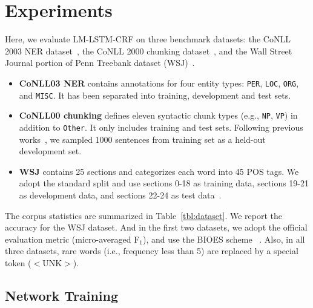 \documentclass[letterpaper]{article} \usepackage{aaai18}  \usepackage{times}  \usepackage{helvet}  \usepackage{courier}  \usepackage{url}  \usepackage{graphicx}  \usepackage{multirow}
\newcommand{\our}{\textsc{LM-LSTM-CRF}\xspace}
\begin{document}
\section{Experiments}
\label{sect:exp}

Here, we evaluate \our on three benchmark datasets: the CoNLL 2003 NER dataset~\cite{tjong2003introduction}, the CoNLL 2000 chunking dataset~\cite{tjong2000introduction}, and the Wall Street Journal portion of Penn Treebank dataset (WSJ)~\cite{marcus1993building}.
\begin{itemize}[noitemsep,nolistsep]
\item \textbf{CoNLL03 NER} contains annotations for four entity types: \texttt{PER}, \texttt{LOC}, \texttt{ORG}, and \texttt{MISC}. It has been separated into training, development and test sets.
\item \textbf{CoNLL00 chunking} defines eleven syntactic chunk types (e.g., \texttt{NP}, \texttt{VP}) in addition to \texttt{Other}. It only includes training and test sets. Following previous works~\cite{peters2017semi}, we sampled 1000 sentences from training set as a held-out development set.
\item \textbf{WSJ} contains 25 sections and categorizes each word into 45 POS tags. We adopt the standard split and use sections 0-18 as training data, sections 19-21 as development data, and sections 22-24 as test data~\cite{manning2011part}.
\end{itemize}

The corpus statistics are summarized in Table~\ref{tbl:dataset}. 
We report the accuracy for the WSJ dataset.
And in the first two datasets, we adopt the official evaluation metric (micro-averaged F$_1$), and use the BIOES scheme
~\cite{ratinov2009design}.
Also, in all three datasets, rare words (i.e., frequency less than 5) are replaced by a special token ($<$UNK$>$).

\subsection{Network Training}
\end{document}
